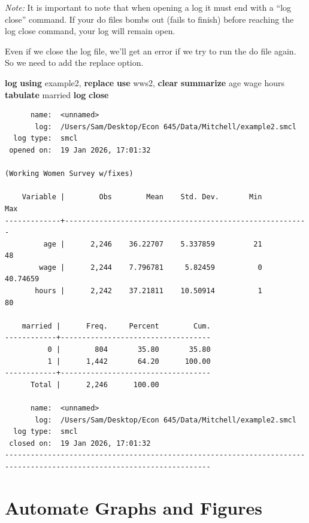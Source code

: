 \documentclass[
]{book}
\newenvironment{Shaded}{\begin{snugshade}}{\end{snugshade}}
\newcommand{\FunctionTok}[1]{\textcolor[rgb]{0.13,0.29,0.53}{\textbf{#1}}}
\newcommand{\KeywordTok}[1]{\textcolor[rgb]{0.13,0.29,0.53}{\textbf{#1}}}
\newcommand{\NormalTok}[1]{#1}
\begin{document}
\emph{Note:} It is important to note that when opening a log it must end with a ``log close'' command. If your do files bombs out (fails to finish) before reaching the log close command, your log will remain open.

Even if we close the log file, we'll get an error if we try to run the do file again. So we need to add the replace option.

\begin{Shaded}
\begin{Highlighting}[]
\FunctionTok{log} \KeywordTok{using}\NormalTok{ example2, }\KeywordTok{replace}
\KeywordTok{use}\NormalTok{ wws2, }\KeywordTok{clear}
\KeywordTok{summarize}\NormalTok{ age wage hours}
\KeywordTok{tabulate}\NormalTok{ married}
\FunctionTok{log} \KeywordTok{close}
\end{Highlighting}
\end{Shaded}

\begin{verbatim}
      name:  <unnamed>
       log:  /Users/Sam/Desktop/Econ 645/Data/Mitchell/example2.smcl
  log type:  smcl
 opened on:  19 Jan 2026, 17:01:32

(Working Women Survey w/fixes)

    Variable |        Obs        Mean    Std. Dev.       Min        Max
-------------+---------------------------------------------------------
         age |      2,246    36.22707    5.337859         21         48
        wage |      2,244    7.796781     5.82459          0   40.74659
       hours |      2,242    37.21811    10.50914          1         80

    married |      Freq.     Percent        Cum.
------------+-----------------------------------
          0 |        804       35.80       35.80
          1 |      1,442       64.20      100.00
------------+-----------------------------------
      Total |      2,246      100.00

      name:  <unnamed>
       log:  /Users/Sam/Desktop/Econ 645/Data/Mitchell/example2.smcl
  log type:  smcl
 closed on:  19 Jan 2026, 17:01:32
----------------------------------------------------------------------------------------------------------------------
\end{verbatim}

\chapter{Automate Graphs and Figures}\label{automate-graphs-and-figures}
\end{document}
